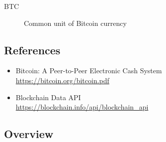 	\begin{description}
		\item[BTC] Common unit of Bitcoin currency
	\end{description}

	\subsection{References}

	\begin{itemize}
		\item Bitcoin: A Peer-to-Peer Electronic Cash System\\ \url{https://bitcoin.org/bitcoin.pdf}
		\item Blockchain Data API\\ \url{https://blockchain.info/api/blockchain_api}
	\end{itemize}

	\subsection{Overview}
